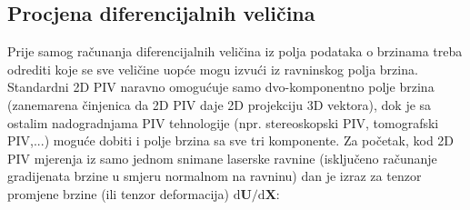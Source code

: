 \subsection{Procjena diferencijalnih veličina}
Prije samog računanja diferencijalnih veličina iz polja podataka o brzinama treba odrediti koje se sve veličine uopće mogu izvući iz ravninskog polja brzina. Standardni 2D PIV naravno omogućuje samo dvo-komponentno polje brzina (zanemarena činjenica da 2D PIV daje 2D projekciju 3D vektora), dok je sa ostalim nadogradnjama PIV tehnologije (npr. stereoskopski PIV, tomografski PIV,...) moguće dobiti i polje brzina sa sve tri komponente. Za početak, kod 2D PIV mjerenja iz samo jednom snimane laserske ravnine (isključeno računanje gradijenata brzine u smjeru normalnom na ravninu) dan je izraz za tenzor promjene brzine (ili tenzor deformacija) $\mathrm{d}\boldsymbol{U}/\mathrm{d}\boldsymbol{X}$:

